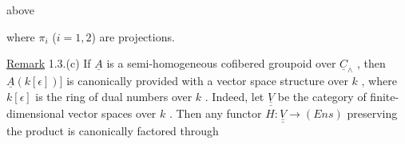 \begin{center}
  above  
\end{center}
where  $\pi_{i}$  ($i = 1,2$)  are projections.

\underline{Remark} 1.3.(c)  If  $\underline{A}$  is a semi-homogeneous cofibered groupoid over  $\underline{C}_{\wedge}$ , then
 $\underline{A}(k [\epsilon])]$ is canonically provided with a vector space structure over  $k$ , where
$k [\epsilon]$ is the ring of dual numbers over  $k$ . Indeed, let  $\underline{\underline{V}}$  be the category of
finite-dimensional vector spaces over  $k$ . Then any functor  $H : \underline{\underline{V}} \to (Ens)$
preserving the product is canonically factored through

